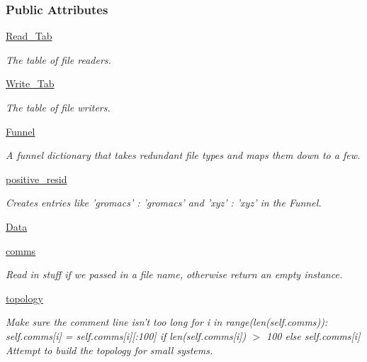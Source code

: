 \subsubsection*{\-Public \-Attributes}
\begin{DoxyCompactItemize}
\item 
\hyperlink{classforcebalance_1_1molecule_1_1Molecule_ab812bbb4ae25ee4f6b69a7926a2ef3e8}{\-Read\-\_\-\-Tab}
\begin{DoxyCompactList}\small\item\em \-The table of file readers. \end{DoxyCompactList}\item 
\hyperlink{classforcebalance_1_1molecule_1_1Molecule_a950a2ec0b5697bf88f192dec676825fc}{\-Write\-\_\-\-Tab}
\begin{DoxyCompactList}\small\item\em \-The table of file writers. \end{DoxyCompactList}\item 
\hyperlink{classforcebalance_1_1molecule_1_1Molecule_a8ee3f691f4ff9c4236afa756ed5482e3}{\-Funnel}
\begin{DoxyCompactList}\small\item\em \-A funnel dictionary that takes redundant file types and maps them down to a few. \end{DoxyCompactList}\item 
\hyperlink{classforcebalance_1_1molecule_1_1Molecule_a5ba227fb037995246be7bca5cf633b8b}{positive\-\_\-resid}
\begin{DoxyCompactList}\small\item\em \-Creates entries like 'gromacs' \-: 'gromacs' and 'xyz' \-: 'xyz' in the \-Funnel. \end{DoxyCompactList}\item 
\hyperlink{classforcebalance_1_1molecule_1_1Molecule_a8698f94608be34eeba6eaa4c52dc5249}{\-Data}
\item 
\hyperlink{classforcebalance_1_1molecule_1_1Molecule_a5e092c726455a18c9300f5c5362121d8}{comms}
\begin{DoxyCompactList}\small\item\em \-Read in stuff if we passed in a file name, otherwise return an empty instance. \end{DoxyCompactList}\item 
\hyperlink{classforcebalance_1_1molecule_1_1Molecule_accabf9159aa7f3c6e514ec048d88eeaa}{topology}
\begin{DoxyCompactList}\small\item\em \-Make sure the comment line isn't too long for i in range(len(self.\-comms))\-: self.\-comms\mbox{[}i\mbox{]} = self.\-comms\mbox{[}i\mbox{]}\mbox{[}\-:100\mbox{]} if len(self.\-comms\mbox{[}i\mbox{]}) $>$ 100 else self.\-comms\mbox{[}i\mbox{]} \-Attempt to build the topology for small systems. \end{DoxyCompactList}\item 

\end{DoxyCompactItemize}
